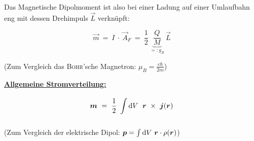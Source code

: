 Das Magnetische Dipolmoment ist also bei einer Ladung auf einer Umlaufbahn eng mit dessen Drehimpuls $\vec{L}$ verknüpft:

\begin{equation*}
\vec{m}  \ =\ I \ \cdot \ \vec{A}_F \ = \ \frac{1}{2} \ \underbrace{\frac{Q}{M}}_{=: g_B} \ \vec{L}
\end{equation*}

(Zum Vergleich das \textsc{Bohr}'sche Magnetron: $\mu_B = \frac{e\hbar}{2m}$)
\newpage

\underline{\textbf{Allgemeine Stromverteilung:}}

\begin{equation*}
\bm{m} \ = \ \frac{1}{2} \ \int\limits_{{}}^{{}}\mathrm{d}{V}\  \; \bm{r}\ \times \ \bm{j}(\bm{r})
\end{equation*}

(Zum Vergleich der elektrische Dipol: $\bm{p} = \int\limits_{{}}^{{}}\mathrm{d}{V}\  \bm{r}\cdot\rho(\bm{r})$)
